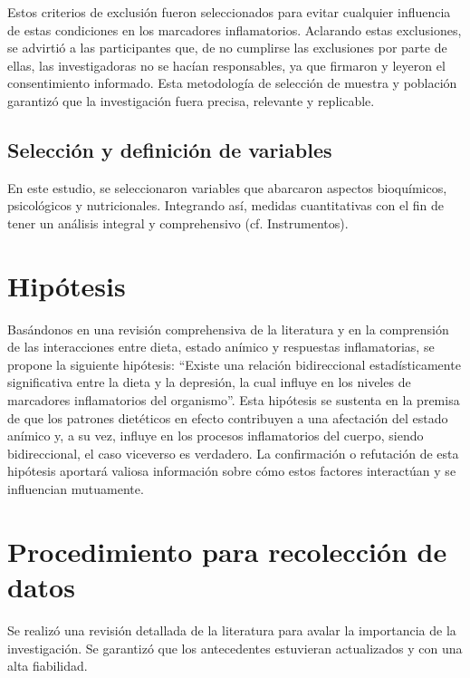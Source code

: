 \documentclass[stu, 12pt]{apa7}
\begin{document}
	
	Estos criterios de exclusión fueron seleccionados para evitar cualquier
	influencia de estas condiciones en los marcadores inflamatorios.
	Aclarando estas exclusiones, se advirtió a las participantes que, de no
	cumplirse las exclusiones por parte de ellas, las investigadoras no se
	hacían responsables, ya que firmaron y leyeron el consentimiento
	informado. Esta metodología de selección de muestra y población
	garantizó que la investigación fuera precisa, relevante y replicable.

	\subsection{Selección y definición de variables}\label{selecciuxf3n-y-definiciuxf3n-de-variables}

	En este estudio, se seleccionaron variables que abarcaron aspectos
	bioquímicos, psicológicos y nutricionales. Integrando así, medidas
	cuantitativas con el fin de tener un análisis integral
	y comprehensivo (cf. Instrumentos).\\



	\section{Hipótesis}\label{hipotesis}

	Basándonos en una revisión comprehensiva de la literatura y en la
	comprensión de las interacciones entre dieta, estado anímico y
	respuestas inflamatorias, se propone la siguiente hipótesis: ``Existe una
	relación bidireccional estadísticamente significativa entre la dieta y
	la depresión, la cual influye en los niveles de marcadores inflamatorios
	del organismo''. Esta hipótesis se sustenta en la premisa de que los
	patrones dietéticos en efecto contribuyen a una afectación del estado
	anímico y, a su vez, influye en los procesos inflamatorios del cuerpo,
	siendo bidireccional, el caso viceverso es verdadero. La confirmación o
	refutación de esta hipótesis aportará valiosa información sobre cómo
	estos factores interactúan y se influencian mutuamente.

	\section{Procedimiento para recolección de datos}\label{procedimiento}

	Se realizó una revisión detallada de la literatura para avalar la importancia de la investigación. Se garantizó que los antecedentes estuvieran actualizados y con una alta fiabilidad.
\end{document}
